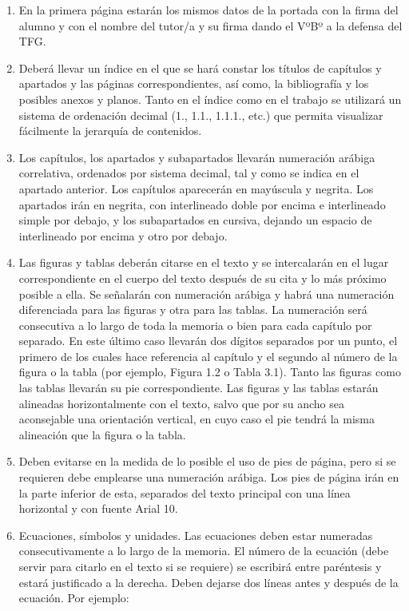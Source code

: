 \begin{enumerate}
\begin{enumerate}
  \item En la primera página estarán los mismos datos de la portada con la firma del alumno y con
    el nombre del tutor/a y su firma dando el VºBº a la defensa del TFG.  
  \item Deberá llevar un índice en el que se hará constar los títulos de capítulos y apartados y las
    páginas correspondientes, así como, la bibliografía y los posibles anexos y planos. Tanto en el
    índice como en el trabajo se utilizará un sistema de ordenación decimal (1., 1.1., 1.1.1., etc.)
    que permita visualizar fácilmente la jerarquía de contenidos.
  \item Los capítulos, los apartados y subapartados llevarán numeración arábiga correlativa,
    ordenados por sistema decimal, tal y como se indica en el apartado anterior. Los capítulos
    aparecerán en mayúscula y negrita. Los apartados irán en negrita, con interlineado doble por
    encima e interlineado simple por debajo, y los subapartados en cursiva, dejando un espacio de
    interlineado por encima y otro por debajo.  
  \item Las figuras y tablas deberán citarse en el texto y se intercalarán en el lugar correspondiente
    en el cuerpo del texto después de su cita y lo más próximo posible a ella. Se señalarán con
    numeración arábiga y habrá una numeración diferenciada para las figuras y otra para las
    tablas. La numeración será consecutiva a lo largo de toda la memoria o bien para cada capítulo
    por separado. En este último caso llevarán dos dígitos separados por un punto, el primero de
    los cuales hace referencia al capítulo y el segundo al número de la figura o la tabla (por
    ejemplo, Figura 1.2 o Tabla 3.1). Tanto las figuras como las tablas llevarán su pie
    correspondiente.
    Las figuras y las tablas estarán alineadas horizontalmente con el texto, salvo que por su ancho
    sea aconsejable una orientación vertical, en cuyo caso el pie tendrá la misma alineación que la
    figura o la tabla.
  \item Deben evitarse en la medida de lo posible el uso de pies de página, pero si se requieren debe
    emplearse una numeración arábiga. Los pies de página irán en la parte inferior de esta,  
    separados del texto principal con una línea horizontal y con fuente Arial 10.
  \item Ecuaciones, símbolos y unidades. Las ecuaciones deben estar numeradas consecutivamente
    a lo largo de la memoria. El número de la ecuación (debe servir para citarlo en el texto si se
    requiere) se escribirá entre paréntesis y estará justificado a la derecha. Deben dejarse dos
    líneas antes y después de la ecuación. Por ejemplo:  


\end{enumerate}
\end{enumerate}
